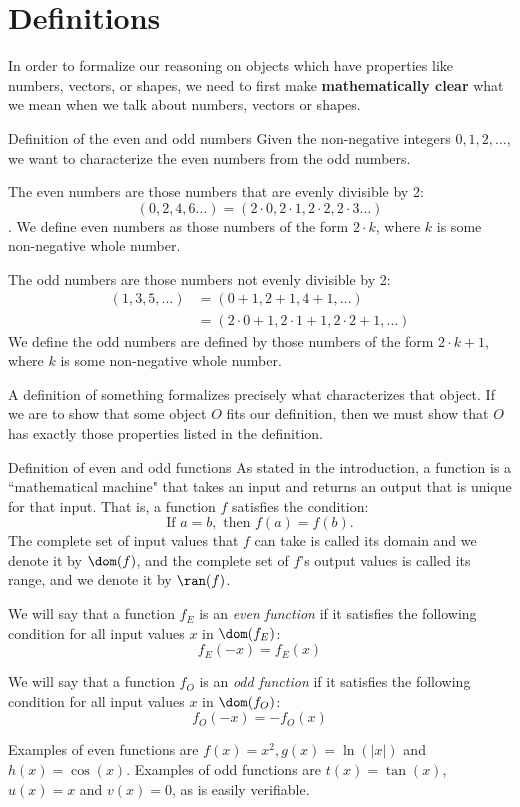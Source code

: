 \section{Definitions}
In order to formalize our reasoning on objects which have properties like
numbers, vectors, or shapes, we need to first make \textbf{mathematically
clear} what we mean when we talk about numbers, vectors or shapes.

\begin{expl}{Definition of the even and odd numbers}
  Given the non-negative integers $0, 1, 2, \ldots$, we want to characterize
  the even numbers from the odd numbers.

  The even numbers are those numbers that are evenly divisible by 2:
  $$(0, 2, 4, 6 \ldots) = (2 \cdot 0, 2 \cdot 1, 2 \cdot 2, 2 \cdot 3 \ldots)$$.
  We define even numbers as those numbers of the form $2 \cdot k$, where $k$
  is some non-negative whole number.


  The odd numbers are those numbers not evenly divisible by 2:
  \begin{align*}
    (1, 3, 5, \ldots) &= (0 + 1, 2 + 1, 4 + 1, \ldots) \\
                      &= (2 \cdot 0 + 1, 2 \cdot 1 + 1, 2 \cdot 2 + 1, \ldots)
  \end{align*}
  We define the odd numbers are defined by those numbers of the form
  $2 \cdot k + 1$, where $k$ is some non-negative whole number.
\end{expl}

A definition of something formalizes precisely what characterizes that
object. If we are to show that some object $O$ fits our definition, then
we must show that $O$ has exactly those properties listed in the definition.

\begin{expl}{Definition of even and odd functions}
  As stated in the introduction, a function is a ``mathematical
  machine" that takes an input and returns an output that is unique for
  that input. That is, a function $f$ satisfies the condition:
  $$\text{If } a = b, \text{ then } f(a) = f(b).$$
  The complete set of input values that $f$ can take is called its domain and
  we denote it by $\dom(f)$, and the complete set of $f$'s output values is
  called its range, and we denote it by $\ran(f)$.


  We will say that a function $f_E$ is an \emph{even function} if it satisfies
  the following condition for all input values $x$ in $\dom(f_E)$:
  $$f_E(-x) = f_E(x)$$

  We will say that a function $f_O$ is an \emph{odd function} if it satisfies
  the following condition for all input values $x$ in $\dom(f_O)$:
  $$f_O(-x) = -f_O(x)$$

  Examples of even functions are $f(x) = x^2, g(x) = \ln(|x|)$ and
  $h(x) = \cos(x)$. Examples of odd functions are $t(x) = \tan(x)$,
  $u(x) = x$ and $v(x) = 0$, as is easily verifiable.
\end{expl}


